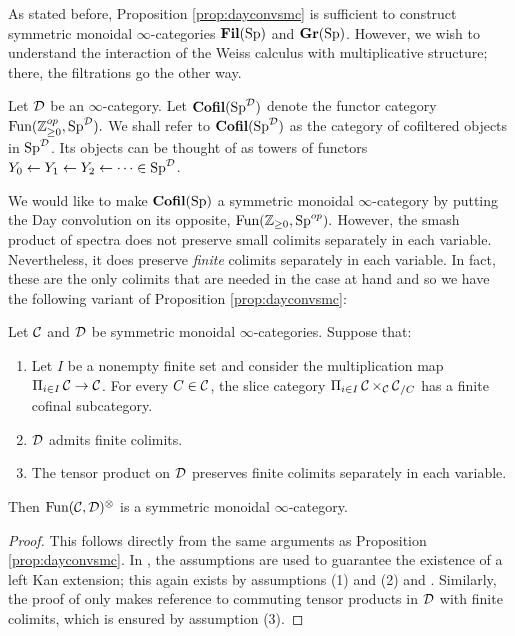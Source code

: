 As stated before, Proposition \ref{prop:dayconvsmc} is sufficient to construct symmetric monoidal $\infty$-categories $\operatorname{\textbf{Fil}}(\operatorname{\text{Sp}})$ and $\operatorname{\textbf{Gr}}(\operatorname{\text{Sp}})$.  However, we wish to understand the interaction of the Weiss calculus with multiplicative structure; there, the filtrations go the other way.

\begin{dfn}Let $\operatorname{\mathcal{D}}$ be an $\infty$-category.  Let $\operatorname{\textbf{Cofil}}(\operatorname{\text{Sp}}^{\operatorname{\mathcal{D}}})$ denote the functor category $\operatorname{\text{Fun}}(\operatorname{\mathbb{Z}}_{\geq 0}^{op}, \operatorname{\text{Sp}}^{\operatorname{\mathcal{D}}}).$  We shall refer to $\operatorname{\textbf{Cofil}}(\operatorname{\text{Sp}}^{\operatorname{\mathcal{D}}})$ as the category of cofiltered objects in $\operatorname{\text{Sp}}^{\operatorname{\mathcal{D}}}$.  Its objects can be thought of as towers of functors $Y_0\leftarrow Y_1\leftarrow Y_2 \leftarrow \cdots \in \operatorname{\text{Sp}}^{\operatorname{\mathcal{D}}}$.
\end{dfn}

We would like to make $\operatorname{\textbf{Cofil}}(\operatorname{\text{Sp}})$ a symmetric monoidal $\infty$-category by putting the Day convolution on its opposite, $\operatorname{\text{Fun}}(\operatorname{\mathbb{Z}}_{\geq 0}, \operatorname{\text{Sp}}^{op}).$  However, the smash product of spectra does not preserve small colimits separately in each variable.  Nevertheless, it does preserve \emph{finite} colimits separately in each variable.  In fact, these are the only colimits that are needed in the case at hand and so we have the following variant of Proposition \ref{prop:dayconvsmc}:

\begin{var}\label{var:day}
Let $\operatorname{\mathcal{C}}$ and $\operatorname{\mathcal{D}}$ be symmetric monoidal $\infty$-categories.  Suppose that:
\begin{enumerate}
\item Let $I$ be a nonempty finite set and consider the multiplication map $\Pi_{i\in I} \operatorname{\mathcal{C}} \to \operatorname{\mathcal{C}}$.  For every $C\in \operatorname{\mathcal{C}}$, the slice category $\Pi_{i\in I}\operatorname{\mathcal{C}} \times_{\operatorname{\mathcal{C}}} \operatorname{\mathcal{C}}_{/C}$ has a finite cofinal subcategory.  
\item $\operatorname{\mathcal{D}}$ admits finite colimits. 
\item The tensor product on $\operatorname{\mathcal{D}}$ preserves finite colimits separately in each variable.  
\end{enumerate}
Then $\operatorname{\text{Fun}}(\operatorname{\mathcal{C}}, \operatorname{\mathcal{D}})^{\otimes}$ is a symmetric monoidal $\infty$-category.  
\end{var}
\begin{proof}
This follows directly from the same arguments as Proposition \ref{prop:dayconvsmc}.  In \cite[Corollary 2.2.6.14]{HA}, the assumptions are used to guarantee the existence of a left Kan extension; this again exists by assumptions (1) and (2) and \cite[Lemma 4.3.2.13]{HTT}.  Similarly, the proof of \cite[Proposition 2.2.6.16]{HA} only makes reference to commuting tensor products in $\operatorname{\mathcal{D}}$ with finite colimits, which is ensured by assumption (3).  
\end{proof}


